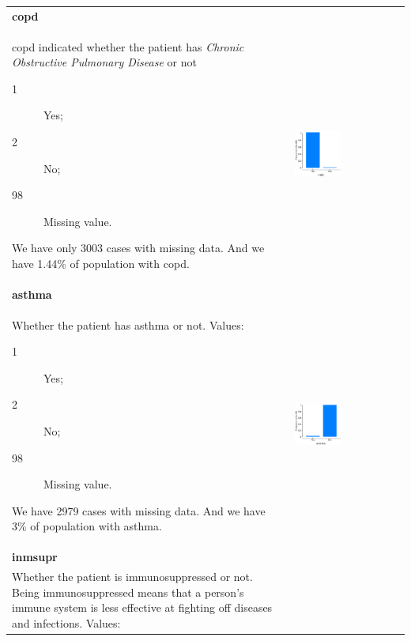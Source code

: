 \begin{longtable}{P{0.45\textwidth}P{0.45\textwidth}}
\\ \hline
\textbf{copd} & \\
copd indicated whether the patient has \emph{Chronic Obstructive Pulmonary 
Disease} or not
\begin{description}
    \item[1] Yes;
    \item[2] No;
    \item[98] Missing value.
\end{description}
We have only 3003 cases with missing data.
And we have 1.44\% of population with copd.
& \includegraphics[width=0.44\textwidth]{img/appendix/feature_copd.png} 
\\ \hline
\textbf{asthma} & \\
Whether the patient has asthma or not. Values:
\begin{description}
    \item[1] Yes;
    \item[2] No;
    \item[98] Missing value.
\end{description}
We have 2979 cases with missing data.
And we have 3\% of population with asthma.
& \includegraphics[width=0.44\textwidth]{img/appendix/feature_asthma.png} 
\\ \hline
\textbf{inmsupr} & \\
Whether the patient is immunosuppressed or not. Being immunosuppressed means that a person's immune system is less effective at fighting off diseases and infections. Values:

\end{longtable}
